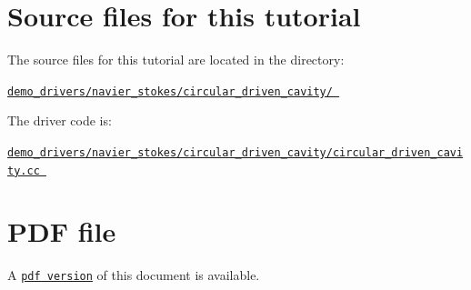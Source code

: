  

\hypertarget{index_sources}{}\section{Source files for this tutorial}\label{index_sources}

\begin{DoxyItemize}
\item The source files for this tutorial are located in the directory\+: \begin{center} \href{../../../../demo_drivers/navier_stokes/circular_driven_cavity/}{\tt demo\+\_\+drivers/navier\+\_\+stokes/circular\+\_\+driven\+\_\+cavity/ } \end{center} 
\item The driver code is\+: \begin{center} \href{../../../../demo_drivers/navier_stokes/circular_driven_cavity/circular_driven_cavity.cc}{\tt demo\+\_\+drivers/navier\+\_\+stokes/circular\+\_\+driven\+\_\+cavity/circular\+\_\+driven\+\_\+cavity.\+cc } \end{center} 
\end{DoxyItemize}



 

 \hypertarget{index_pdf}{}\section{P\+D\+F file}\label{index_pdf}
A \href{../latex/refman.pdf}{\tt pdf version} of this document is available. 
